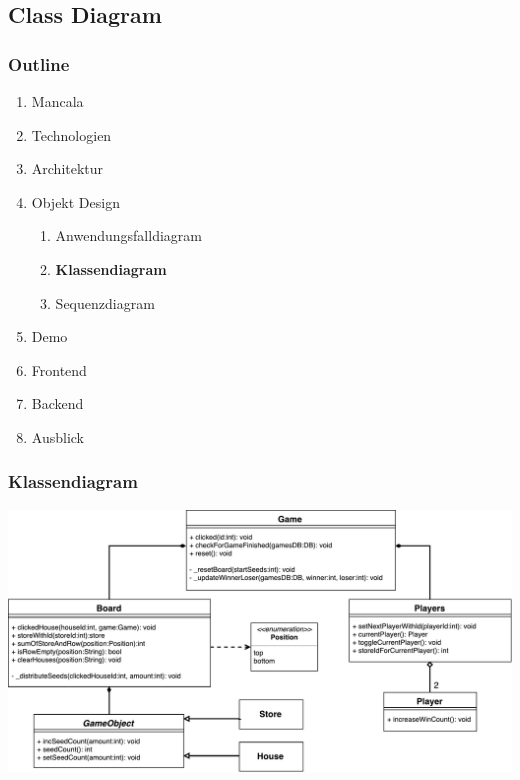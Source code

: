 \documentclass[
	10pt,
	t		%
]{beamer}
\begin{document}
\subsection{Class Diagram}
\begin{frame}
\frametitle{Outline}
\begin{enumerate}
\item Mancala
\item Technologien
\item Architektur
\item Objekt Design
\begin{enumerate}
\item Anwendungsfalldiagram
\item \textbf{Klassendiagram}
\item Sequenzdiagram
\end{enumerate}
\item Demo
\item Frontend
\item Backend
\item Ausblick
\end{enumerate}
\end{frame}

\begin{frame}
\frametitle{Klassendiagram}
\begin{center}
\includegraphics[scale=0.32]{./../Diagrams/Classes.pdf}
\end{center}
\end{frame}
\end{document}
